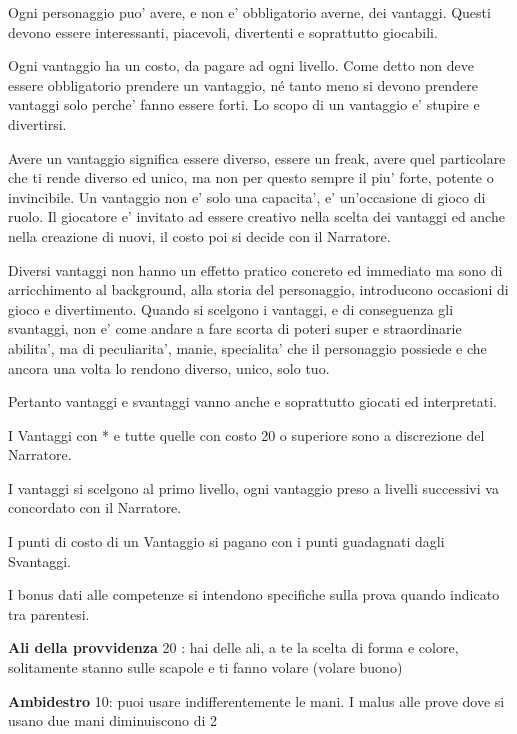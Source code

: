 \documentclass[a4paper,11pt,twoside,openany]{book}
\begin{document}
\bigskip

Ogni personaggio puo' avere, e non e' obbligatorio averne, dei vantaggi. Questi devono essere interessanti, piacevoli, divertenti e soprattutto giocabili.

Ogni vantaggio ha un costo, da pagare ad ogni livello. Come detto non deve essere obbligatorio prendere un vantaggio, né tanto meno si devono prendere vantaggi solo perche' fanno essere forti. Lo scopo di un vantaggio e' stupire e divertirsi. 

Avere un vantaggio significa essere diverso, essere un freak, avere quel particolare che ti rende diverso ed unico, ma non per questo sempre il piu' forte, potente o invincibile. Un vantaggio non e' solo una capacita', e' un'occasione di gioco di ruolo. Il giocatore e' invitato ad essere creativo nella scelta dei vantaggi ed anche nella creazione di nuovi, il costo poi si decide con il Narratore.

Diversi vantaggi non hanno un effetto pratico concreto ed immediato ma sono di arricchimento al background, alla storia del personaggio, introducono occasioni di gioco e divertimento. Quando si scelgono i vantaggi, e di conseguenza gli svantaggi, non e' come andare a fare scorta di poteri super e straordinarie abilita', ma di peculiarita', manie, specialita' che il personaggio possiede e che ancora una volta lo rendono diverso, unico, solo tuo. 

Pertanto vantaggi e svantaggi vanno anche e soprattutto giocati ed interpretati.

I Vantaggi con {*} e tutte quelle con costo 20 o superiore sono a discrezione del Narratore.

I vantaggi si scelgono al primo livello, ogni vantaggio preso a livelli successivi va concordato con il Narratore.

I punti di costo di un Vantaggio si pagano con i punti guadagnati dagli Svantaggi.

I bonus dati alle competenze si intendono specifiche sulla prova quando indicato tra parentesi.

\bigskip

\textbf{Ali della provvidenza} 20 : hai delle ali, a te la scelta di forma e colore, solitamente stanno sulle scapole e ti fanno volare (volare buono)

\textbf{Ambidestro}\label{Ambidestro} 10: puoi usare indifferentemente le mani. I malus alle prove dove si usano due mani diminuiscono di 2
\end{document}
